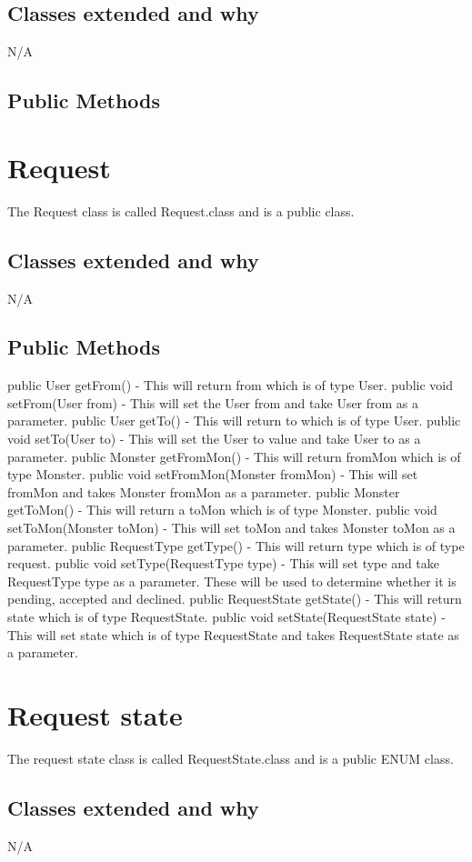 \documentclass{project}
\begin{document}
\subsection{Classes extended and why}
N/A
\subsection{Public Methods}


\section{Request}
The Request class is called Request.class and is a public class.
\subsection{Classes extended and why}
N/A
\subsection{Public Methods}
public User getFrom() - This will return from which is of type User. public void setFrom(User from) - This will set the User from and take User from as a parameter.
public User getTo() - This will return to which is of type User. public void setTo(User to) - This will set the User to value and take User to as a parameter.
public Monster getFromMon() - This will return fromMon which is of type Monster. public void setFromMon(Monster fromMon) - This will set fromMon and takes Monster fromMon as a parameter.
public Monster getToMon() - This will return a toMon which is of type Monster. public void setToMon(Monster toMon) - This will set toMon and takes Monster toMon as a parameter.
public RequestType getType() - This will return type which is of type request. public void setType(RequestType type) - This will set type and take RequestType type as a parameter. These will be used to determine whether it is pending, accepted and declined.
public RequestState getState() - This will return state which is of type RequestState. public void setState(RequestState state) - This will set state which is of type RequestState and takes RequestState state as a parameter.

\section{Request state}
The request state class is called RequestState.class and is a public ENUM class.
\subsection{Classes extended and why}
N/A
\end{document}
